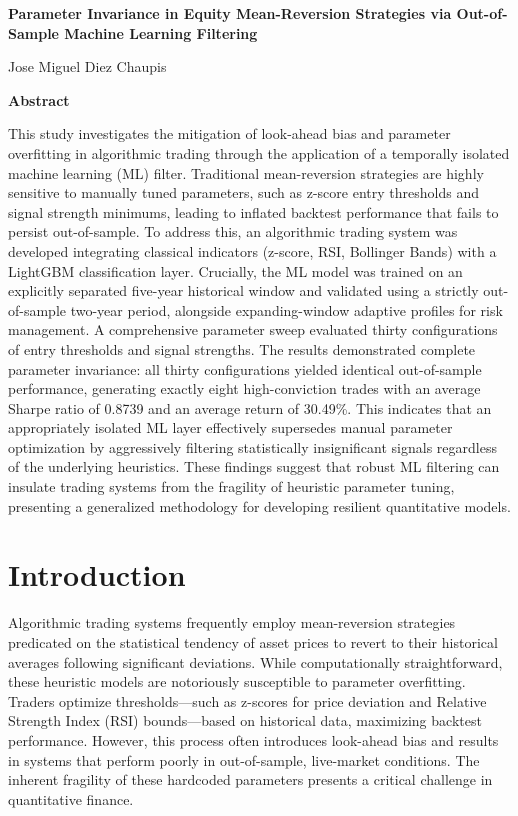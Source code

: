 \documentclass[12pt]{article}
\begin{document}
\begin{center}
    \textbf{\Large Parameter Invariance in Equity Mean-Reversion Strategies via Out-of-Sample Machine Learning Filtering}
    \vspace{0.5cm}
    
    Jose Miguel Diez Chaupis
\end{center}

\vspace{0.5cm}
\begin{center}
    \textbf{Abstract}
\end{center}

This study investigates the mitigation of look-ahead bias and parameter overfitting in algorithmic trading through the application of a temporally isolated machine learning (ML) filter. Traditional mean-reversion strategies are highly sensitive to manually tuned parameters, such as z-score entry thresholds and signal strength minimums, leading to inflated backtest performance that fails to persist out-of-sample. To address this, an algorithmic trading system was developed integrating classical indicators (z-score, RSI, Bollinger Bands) with a LightGBM classification layer. Crucially, the ML model was trained on an explicitly separated five-year historical window and validated using a strictly out-of-sample two-year period, alongside expanding-window adaptive profiles for risk management. A comprehensive parameter sweep evaluated thirty configurations of entry thresholds and signal strengths. The results demonstrated complete parameter invariance: all thirty configurations yielded identical out-of-sample performance, generating exactly eight high-conviction trades with an average Sharpe ratio of 0.8739 and an average return of 30.49\%. This indicates that an appropriately isolated ML layer effectively supersedes manual parameter optimization by aggressively filtering statistically insignificant signals regardless of the underlying heuristics. These findings suggest that robust ML filtering can insulate trading systems from the fragility of heuristic parameter tuning, presenting a generalized methodology for developing resilient quantitative models.

\newpage
\section*{Introduction}

Algorithmic trading systems frequently employ mean-reversion strategies predicated on the statistical tendency of asset prices to revert to their historical averages following significant deviations. While computationally straightforward, these heuristic models are notoriously susceptible to parameter overfitting. Traders optimize thresholds—such as z-scores for price deviation and Relative Strength Index (RSI) bounds—based on historical data, maximizing backtest performance. However, this process often introduces look-ahead bias and results in systems that perform poorly in out-of-sample, live-market conditions. The inherent fragility of these hardcoded parameters presents a critical challenge in quantitative finance.
\end{document}
